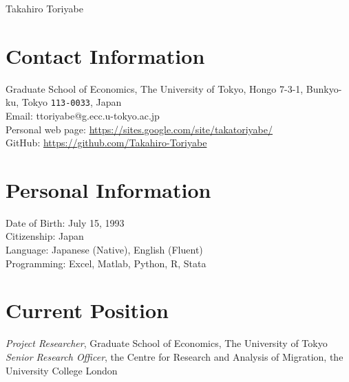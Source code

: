 \documentclass[11pt, a4paper]{article} %
\begin{document}

{\LARGE Takahiro Toriyabe}\\[1cm] %

\section*{Contact Information}
Graduate School of Economics, The University of Tokyo, Hongo 7-3-1, Bunkyo-ku, Tokyo \texttt{113-0033}, Japan\\
Email: ttoriyabe@g.ecc.u-tokyo.ac.jp\\ %
Personal web page: \url{https://sites.google.com/site/takatoriyabe/} \\ %
GitHub: \url{https://github.com/Takahiro-Toriyabe}



\section*{Personal Information}

Date of Birth: July 15, 1993\\ %
Citizenship: Japan\\ %
Language: Japanese (Native), English (Fluent) \\
Programming: Excel, Matlab, Python, R, Stata


\section*{Current Position}

\emph{Project Researcher}, Graduate School of Economics, The University of Tokyo \\
\emph{Senior Research Officer}, the Centre for Research and Analysis of Migration, the University College London
\end{document}
